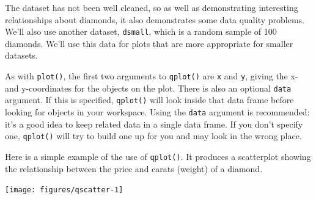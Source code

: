 The dataset has not been well cleaned, so as well as demonstrating
interesting relationships about diamonds, it also demonstrates some data
quality problems. We'll also use another dataset, \texttt{dsmall}, which
is a random sample of 100 diamonds. We'll use this data for plots that
are more appropriate for smaller datasets.

\begin{Shaded}
\begin{Highlighting}[]
\NormalTok{>}\StringTok{ }\NormalTok{(}\NormalTok{) }
\NormalTok{>}\StringTok{ }\StringTok{ }\NormalTok{diamonds[}\NormalTok{(}\NormalTok{), ]}
\end{Highlighting}
\end{Shaded}


As with \texttt{plot()}, the first two arguments to \texttt{qplot()} are
\texttt{x} and \texttt{y}, giving the x- and y-coordinates for the
objects on the plot. There is also an optional \texttt{data} argument.
If this is specified, \texttt{qplot()} will look inside that data frame
before looking for objects in your workspace. Using the \texttt{data}
argument is recommended: it's a good idea to keep related data in a
single data frame. If you don't specify one, \texttt{qplot()} will try
to build one up for you and may look in the wrong place.
 

Here is a simple example of the use of \texttt{qplot()}. It produces a
scatterplot showing the relationship between the price and carats
(weight) of a diamond. 

\begin{Shaded}
\begin{Highlighting}[]
\NormalTok{>}\StringTok{ } 
\end{Highlighting}
\end{Shaded}

\begin{flushleft}\texttt{[image: figures/qscatter-1]} \end{flushleft}

